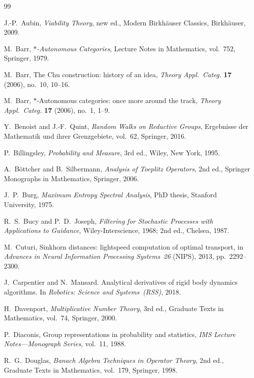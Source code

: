 \begin{thebibliography}{99}

J.-P.~Aubin,
\emph{Viability Theory}, new ed.,
Modern Birkh\"auser Classics, Birkh\"auser, 2009.

M.~Barr,
\emph{$*$-Autonomous Categories},
Lecture Notes in Mathematics, vol.~752, Springer, 1979.

M.~Barr,
The Chu construction: history of an idea,
\emph{Theory Appl.\ Categ.} \textbf{17} (2006), no.~10, 10--16.

M.~Barr,
$*$-Autonomous categories: once more around the track,
\emph{Theory Appl.\ Categ.} \textbf{17} (2006), no.~1, 1--9.

Y.~Benoist and J.-F.~Quint,
\emph{Random Walks on Reductive Groups},
Ergebnisse der Mathematik und ihrer Grenzgebiete, vol.~62, Springer, 2016.

P.~Billingsley,
\emph{Probability and Measure}, 3rd ed.,
Wiley, New York, 1995.

A.~B\"ottcher and B.~Silbermann,
\emph{Analysis of Toeplitz Operators}, 2nd ed.,
Springer Monographs in Mathematics, Springer, 2006.

J.~P.~Burg,
\emph{Maximum Entropy Spectral Analysis},
PhD thesis, Stanford University, 1975.

R.~S.~Bucy and P.~D.~Joseph,
\emph{Filtering for Stochastic Processes with Applications to Guidance},
Wiley-Interscience, 1968; 2nd ed., Chelsea, 1987.

M.~Cuturi,
Sinkhorn distances: lightspeed computation of optimal transport,
in \emph{Advances in Neural Information Processing Systems~26} (NIPS),
2013, pp.~2292--2300.

J.~Carpentier and N.~Mansard.
\newblock Analytical derivatives of rigid body dynamics algorithms.
\newblock In \emph{Robotics: Science and Systems~(RSS)}, 2018.

H.~Davenport,
\emph{Multiplicative Number Theory}, 3rd ed.,
Graduate Texts in Mathematics, vol.~74, Springer, 2000.

P.~Diaconis,
Group representations in probability and statistics,
\emph{IMS Lecture Notes---Monograph Series}, vol.~11, 1988.

R.~G.~Douglas,
\emph{Banach Algebra Techniques in Operator Theory}, 2nd ed.,
Graduate Texts in Mathematics, vol.~179, Springer, 1998.


\end{thebibliography}
